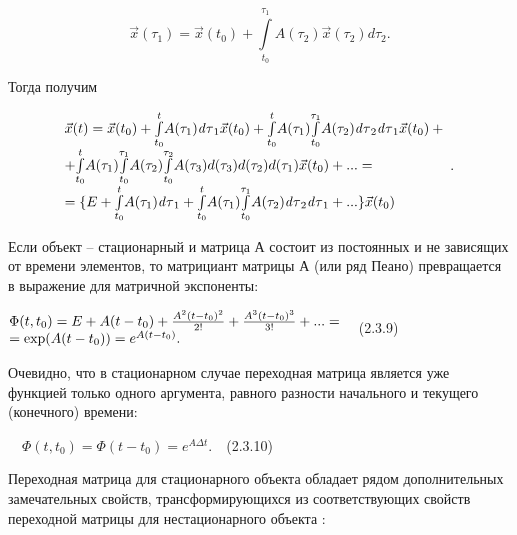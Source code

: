 \begin{equation*}
\vec x(\tau _1)=\vec x(t_0)+\overset{\tau _1}{\underset{t_0}{\int }}A(\tau _2)\vec x(\tau _2)\mathit{d\tau }_2.
\end{equation*}

		Тогда получим


\begin{equation*}
\begin{matrix}\vec x(t)=\vec x(t_0)+\overset t{\underset{t_0}{\int }}A(\tau _1)\mathit{d\tau }_1\vec x(t_0)+\overset
t{\underset{t_0}{\int }}A(\tau _1)\overset{\tau _1}{\underset{t_0}{\int }}A(\tau _2)\mathit{d\tau }_2\mathit{d\tau }_1\vec
x(t_0)+\hfill\null \\+\overset t{\underset{t_0}{\int }}A(\tau _1)\overset{\tau _1}{\underset{t_0}{\int
}}A(\tau _2)\overset{\tau _2}{\underset{t_0}{\int }}A(\tau _3)d(\tau _3)d(\tau _2)d(\tau _1)\vec x(t_0)+...=\hfill\null \\=\{E+\overset
t{\underset{t_0}{\int }}A(\tau _1)\mathit{d\tau }_1+\overset t{\underset{t_0}{\int }}A(\tau _1)\overset{\tau _1}{\underset{t_0}{\int
}}A(\tau _2)\mathit{d\tau }_2\mathit{d\tau }_1+...\}\vec x(t_0)\hfill\null \end{matrix}\;.\hfill 
\end{equation*}

		Если объект – стационарный и матрица А состоит из постоянных и не зависящих от времени элементов, то матрициант матрицы
		А (или ряд Пеано) превращается в выражение для матричной экспоненты:



		$\begin{matrix}\Phi (t,t_0)=E+A(t-t_0)+\frac{A^2(t-t_0)^2}{2!}+\frac{A^3(t-t_0)^3}{3!}+...=\hfill\null
		\\=\text{exp}(A(t-t_0))=e^{A(t-t_0)}.\hfill\null \end{matrix}\hfill $\ \ (2.3.9)



		Очевидно, что в стационарном случае переходная матрица является уже функцией только одного аргумента, равного разности
		начального и текущего (конечного) времени:



		\ \  $\Phi (t,t_0)=\Phi (t-t_0)=e^{\mathit{A\Delta t}}.$\ \ (2.3.10)



		Переходная матрица для стационарного объекта обладает рядом дополнительных замечательных свойств, трансформирующихся из
		соответствующих свойств переходной матрицы для нестационарного   объекта :



